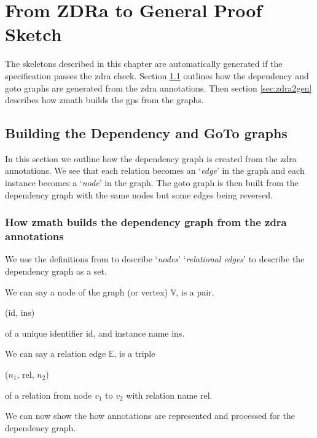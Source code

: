 \chapter{From ZDRa to General Proof Sketch}
\label{ch:skeletons}

The skeletons described in this chapter are automatically generated if the
specification passes the \gls{zdra} check. Section \ref{sec:buildinggraphs}
outlines how the dependency and goto graphs are generated from the \gls{zdra}
annotations. Then section \ref{sec:zdra2gen} describes how \gls{zmath} builds
the \gls{gps} from the graphs. 

\section{Building the Dependency and GoTo graphs}
\label{sec:buildinggraphs}

In this section we outline how the dependency graph is created from the
\gls{zdra} annotations. We see that each relation becomes an `\emph{edge}' in
the graph and each instance becomes a `\emph{node}' in the graph. The goto graph
is then built from the dependency graph with the same nodes but some edges being
reversed.

\subsection{How \gls{zmath} builds the dependency graph from the \gls{zdra} annotations}

We use the definitions from \cite{zengfirstyear} to describe `\emph{nodes}'
`\emph{relational edges}' to describe the dependency graph as a set.

\begin{defin}[Nodes] We can say a node of the graph (or vertex) $\mathbb{V}$, is
a pair.
\begin{center}
(id, ins)
\end{center}
of a unique identifier id, and instance name ins. 
\end{defin} 

\begin{defin} We can say a relation edge $\mathbb{E}$, is a
triple
\begin{center}
($n_{1}$, rel, $n_{2}$)
\end{center}
of a relation from node $v_{1}$ to $v_{2}$ with relation name rel.
\end{defin} 

We can now show the how annotations are represented and processed for the
dependency graph.

